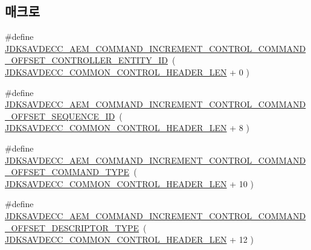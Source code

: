 \subsection*{매크로}
\begin{DoxyCompactItemize}
\item 
\#define \hyperlink{group__command__increment__control_gaa572148a02936842816830ecb59b6c3c}{J\+D\+K\+S\+A\+V\+D\+E\+C\+C\+\_\+\+A\+E\+M\+\_\+\+C\+O\+M\+M\+A\+N\+D\+\_\+\+I\+N\+C\+R\+E\+M\+E\+N\+T\+\_\+\+C\+O\+N\+T\+R\+O\+L\+\_\+\+C\+O\+M\+M\+A\+N\+D\+\_\+\+O\+F\+F\+S\+E\+T\+\_\+\+C\+O\+N\+T\+R\+O\+L\+L\+E\+R\+\_\+\+E\+N\+T\+I\+T\+Y\+\_\+\+ID}~( \hyperlink{group__jdksavdecc__avtp__common__control__header_gaae84052886fb1bb42f3bc5f85b741dff}{J\+D\+K\+S\+A\+V\+D\+E\+C\+C\+\_\+\+C\+O\+M\+M\+O\+N\+\_\+\+C\+O\+N\+T\+R\+O\+L\+\_\+\+H\+E\+A\+D\+E\+R\+\_\+\+L\+EN} + 0 )
\item 
\#define \hyperlink{group__command__increment__control_ga7b1b17926c1506e54a9c051f827b0bcf}{J\+D\+K\+S\+A\+V\+D\+E\+C\+C\+\_\+\+A\+E\+M\+\_\+\+C\+O\+M\+M\+A\+N\+D\+\_\+\+I\+N\+C\+R\+E\+M\+E\+N\+T\+\_\+\+C\+O\+N\+T\+R\+O\+L\+\_\+\+C\+O\+M\+M\+A\+N\+D\+\_\+\+O\+F\+F\+S\+E\+T\+\_\+\+S\+E\+Q\+U\+E\+N\+C\+E\+\_\+\+ID}~( \hyperlink{group__jdksavdecc__avtp__common__control__header_gaae84052886fb1bb42f3bc5f85b741dff}{J\+D\+K\+S\+A\+V\+D\+E\+C\+C\+\_\+\+C\+O\+M\+M\+O\+N\+\_\+\+C\+O\+N\+T\+R\+O\+L\+\_\+\+H\+E\+A\+D\+E\+R\+\_\+\+L\+EN} + 8 )
\item 
\#define \hyperlink{group__command__increment__control_gab16499d4fd0818f9cfcd82a7197d910e}{J\+D\+K\+S\+A\+V\+D\+E\+C\+C\+\_\+\+A\+E\+M\+\_\+\+C\+O\+M\+M\+A\+N\+D\+\_\+\+I\+N\+C\+R\+E\+M\+E\+N\+T\+\_\+\+C\+O\+N\+T\+R\+O\+L\+\_\+\+C\+O\+M\+M\+A\+N\+D\+\_\+\+O\+F\+F\+S\+E\+T\+\_\+\+C\+O\+M\+M\+A\+N\+D\+\_\+\+T\+Y\+PE}~( \hyperlink{group__jdksavdecc__avtp__common__control__header_gaae84052886fb1bb42f3bc5f85b741dff}{J\+D\+K\+S\+A\+V\+D\+E\+C\+C\+\_\+\+C\+O\+M\+M\+O\+N\+\_\+\+C\+O\+N\+T\+R\+O\+L\+\_\+\+H\+E\+A\+D\+E\+R\+\_\+\+L\+EN} + 10 )
\item 
\#define \hyperlink{group__command__increment__control_gab6f92328d54d984c88303e83f8ccf72b}{J\+D\+K\+S\+A\+V\+D\+E\+C\+C\+\_\+\+A\+E\+M\+\_\+\+C\+O\+M\+M\+A\+N\+D\+\_\+\+I\+N\+C\+R\+E\+M\+E\+N\+T\+\_\+\+C\+O\+N\+T\+R\+O\+L\+\_\+\+C\+O\+M\+M\+A\+N\+D\+\_\+\+O\+F\+F\+S\+E\+T\+\_\+\+D\+E\+S\+C\+R\+I\+P\+T\+O\+R\+\_\+\+T\+Y\+PE}~( \hyperlink{group__jdksavdecc__avtp__common__control__header_gaae84052886fb1bb42f3bc5f85b741dff}{J\+D\+K\+S\+A\+V\+D\+E\+C\+C\+\_\+\+C\+O\+M\+M\+O\+N\+\_\+\+C\+O\+N\+T\+R\+O\+L\+\_\+\+H\+E\+A\+D\+E\+R\+\_\+\+L\+EN} + 12 )

\end{DoxyCompactItemize}
